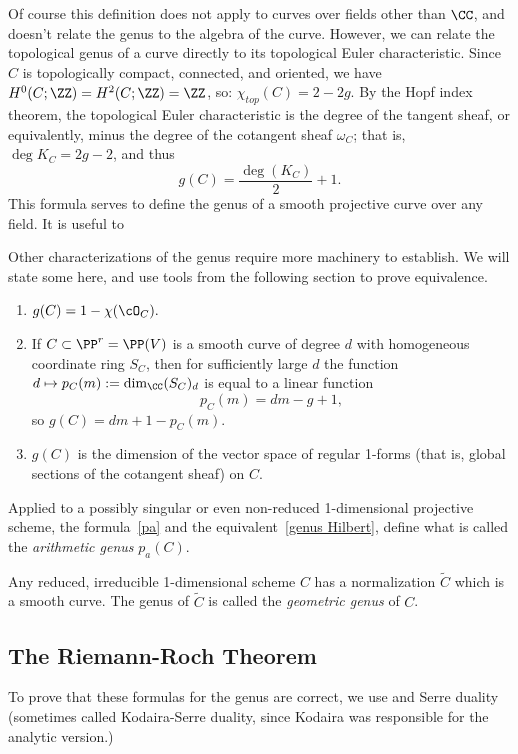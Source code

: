 Of course this definition does not apply to curves over fields other than $\CC$, and doesn't relate the genus to the algebra of the curve. However, we can relate the topological genus of a curve directly to its topological Euler characteristic. Since $C$ is topologically compact, connected, and oriented, we have
$H^{0}(C; \ZZ)=H^{2}(C; \ZZ) = \ZZ$, so:
$
\chi_{top}(C) = 2-2g.
$
By the Hopf index theorem, the topological Euler characteristic is the degree of the tangent sheaf, or equivalently, minus the degree of the cotangent sheaf $\omega_{C}$; that is, $\deg K_{C} = 2g-2$, and thus
$$
g(C) = \frac{\deg(K_C)}{2} + 1.
$$
This formula serves to define the genus of a smooth projective curve over any field. It is useful to 

Other characterizations of the genus require more machinery to establish. We will state some here, and use  tools from the following section to prove equivalence.

\begin{enumerate}

\item 
$
g(C) = 1 - \chi(\cO_C). \label{pa}
$

\item\label{genus Hilbert} If $C \subset \PP^r = \PP(V)$ is a smooth curve of degree $d$  with homogeneous coordinate ring
$S_C$, then for sufficiently large $d$ the function $d \mapsto p_C(m) := \dim_\CC (S_C)_d$ is equal to a linear function
$$
p_C(m) =  dm - g + 1,
$$
so $g(C) = dm+1-p_C(m)$. 

\item\label{genus 1forms} $g(C)$ is the dimension of the vector space of regular 1-forms (that is, global sections of the
cotangent sheaf) on $C$.
\end{enumerate}


Applied to a possibly singular or even non-reduced 1-dimensional projective scheme, the formula~\ref{pa} and the equivalent~\ref{genus Hilbert}, define
what is called the \emph{arithmetic genus} $p_a(C)$. 

Any reduced, irreducible 1-dimensional scheme $C$ has a normalization $\widetilde C$ which is a smooth curve. The genus of $\widetilde C$ is called the \emph{geometric genus} of $C$.

\subsection{The Riemann-Roch Theorem}

To prove that these formulas for the genus are correct, we use \trr and Serre duality (sometimes called Kodaira-Serre duality, since Kodaira was responsible for the analytic version.)

